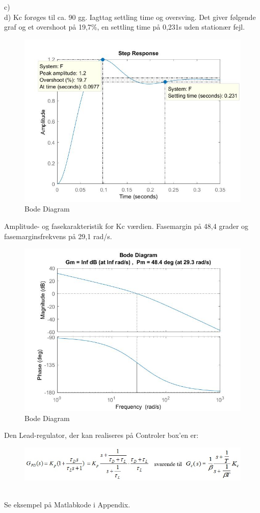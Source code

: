 \documentclass[]{report}
\begin{document}
\newline c)\\
\newline d) Kc forøges til ca. 90 gg. Iagttag settling time og oversving. Det giver følgende graf og et overshoot på 19,7\%, en settling time på 0,231s uden stationær fejl.
\begin{figure}[h]
	\centering
	\includegraphics[width=0.68\linewidth]{graphics/d_steprespons}
	\caption{Bode Diagram}
	\label{fig:dsteprespons}
\end{figure}
\newline Amplitude- og fasekarakteristik for Kc værdien. Fasemargin på 48,4 grader og fasemarginsfrekvens på 29,1 rad/s. 
\begin{figure}[h]
	\centering
	\includegraphics[width=0.68\linewidth]{graphics/d_fasekarakteristik}
	\caption{Bode Diagram}
	\label{fig:dfasekarakteristik}
\end{figure}
\newline \noindent Den Lead-regulator, der kan realiseres på Controler box’en er:
\begin{figure}[h]
	\centering
	\includegraphics[width=1\linewidth]{graphics/lead_regulator}
	\label{fig:leadregulator}
\end{figure}
\\Se eksempel på Matlabkode i Appendix.
\end{document}
